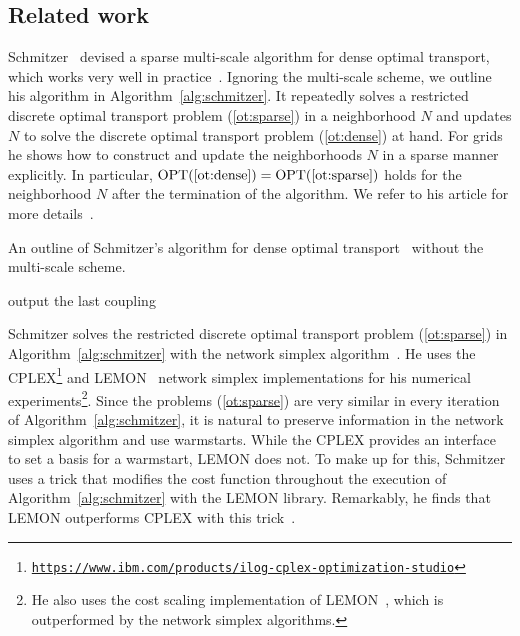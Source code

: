 \documentclass[a4paper,UKenglish,cleveref, autoref, thm-restate]{lipics-v2021}
\DeclareMathOperator{\OPT}{OPT}
\begin{document}
\subsection{Related work}
Schmitzer~\cite{schmitzer2016sparse} devised a sparse multi-scale algorithm for dense optimal transport, which works very well in practice~\cite{schrieber2017dotmark}.
Ignoring the multi-scale scheme, we outline his algorithm in Algorithm~\ref{alg:schmitzer}.
It repeatedly solves a restricted discrete optimal transport problem (\ref{ot:sparse}) in a neighborhood $N$ and updates $N$ to solve the discrete optimal transport problem (\ref{ot:dense}) at hand.
For grids he shows how to construct and update the neighborhoods $N$ in a sparse manner explicitly.
In particular, $\OPT(\text{\ref{ot:dense}}) = \OPT(\text{\ref{ot:sparse}})$ holds for the neighborhood $N$ after the termination of the algorithm.
We refer to his article for more details~\cite{schmitzer2016sparse}.
\begin{algorithm}[h]
\caption{An outline of Schmitzer's algorithm for dense optimal transport~\cite{schmitzer2016sparse} without the multi-scale scheme.}\label{alg:schmitzer}
\DontPrintSemicolon
{}
output the last coupling\;
\end{algorithm}

Schmitzer solves the restricted discrete optimal transport problem (\ref{ot:sparse}) in Algorithm~\ref{alg:schmitzer} with the network simplex algorithm~\cite{ahuja1993networkflows}.
He uses the CPLEX\footnote{\href{https://www.ibm.com/products/ilog-cplex-optimization-studio}{\tt https://www.ibm.com/products/ilog-cplex-optimization-studio}} and LEMON~\cite{dezso2010lemon} network simplex implementations for his numerical experiments\footnote{He also uses the cost scaling implementation of LEMON~\cite{dezso2010lemon}, which is outperformed by the network simplex algorithms.}.
Since the problems (\ref{ot:sparse}) are very similar in every iteration of Algorithm~\ref{alg:schmitzer}, it is natural to preserve information in the network simplex algorithm and use warmstarts.
While the CPLEX provides an interface to set a basis for a warmstart, LEMON does not.
To make up for this, Schmitzer uses a trick that modifies the cost function throughout the execution of Algorithm~\ref{alg:schmitzer} with the LEMON library.
Remarkably, he finds that LEMON outperforms CPLEX with this trick~\cite{schmitzer2016sparse}.
\end{document}
